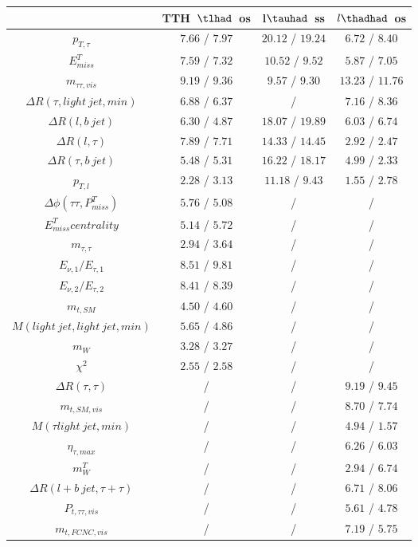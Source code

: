 \begin{tabular}{|c|c|c|c|} \hline
 & TTH~$\tlhad$~os & l$\tauhad$~ss & $l\thadhad$~os\\\hline
$p_{T,\tau }$ & $7.66$ / $7.97$ & $20.12$ / $19.24$ & $6.72$ / $8.40$\\\hline
$E^{T}_{miss}$ & $7.59$ / $7.32$ & $10.52$ / $9.52$ & $5.87$ / $7.05$\\\hline
$m_{\tau \tau ,vis}$ & $9.19$ / $9.36$ & $9.57$ / $9.30$ & $13.23$ / $11.76$\\\hline
$\Delta R(\tau ,light~jet,min)$ & $6.88$ / $6.37$ &  / & $7.16$ / $8.36$\\\hline
$\Delta R(l,b~jet)$ & $6.30$ / $4.87$ & $18.07$ / $19.89$ & $6.03$ / $6.74$\\\hline
$\Delta R(l,\tau )$ & $7.89$ / $7.71$ & $14.33$ / $14.45$ & $2.92$ / $2.47$\\\hline
$\Delta R(\tau ,b~jet)$ & $5.48$ / $5.31$ & $16.22$ / $18.17$ & $4.99$ / $2.33$\\\hline
$p_{T,l}$ & $2.28$ / $3.13$ & $11.18$ / $9.43$ & $1.55$ / $2.78$\\\hline
$\Delta\phi(\tau \tau ,P^{T}_{miss})$ & $5.76$ / $5.08$ &  / &  /\\\hline
$E^{T}_{miss} centrality$ & $5.14$ / $5.72$ &  / &  /\\\hline
$m_{\tau ,\tau }$ & $2.94$ / $3.64$ &  / &  /\\\hline
$E_{\nu,1}/E_{\tau ,1}$ & $8.51$ / $9.81$ &  / &  /\\\hline
$E_{\nu,2}/E_{\tau ,2}$ & $8.41$ / $8.39$ &  / &  /\\\hline
$m_{t,SM}$ & $4.50$ / $4.60$ &  / &  /\\\hline
$M(light~jet,light~jet,min)$ & $5.65$ / $4.86$ &  / &  /\\\hline
$m_{W}$ & $3.28$ / $3.27$ &  / &  /\\\hline
$\chi^{2}$ & $2.55$ / $2.58$ &  / &  /\\\hline
$\Delta R(\tau ,\tau )$ &  / &  / & $9.19$ / $9.45$\\\hline
$m_{t,SM,vis}$ &  / &  / & $8.70$ / $7.74$\\\hline
$M(\tau  light~jet,min)$ &  / &  / & $4.94$ / $1.57$\\\hline
$\eta_{\tau ,max}$ &  / &  / & $6.26$ / $6.03$\\\hline
$m^{T}_{W}$ &  / &  / & $2.94$ / $6.74$\\\hline
$\Delta R(l+b~jet,\tau +\tau )$ &  / &  / & $6.71$ / $8.06$\\\hline
$P_{t,\tau \tau ,vis}$ &  / &  / & $5.61$ / $4.78$\\\hline
$m_{t,FCNC,vis}$ &  / &  / & $7.19$ / $5.75$\\\hline
\end{tabular}
